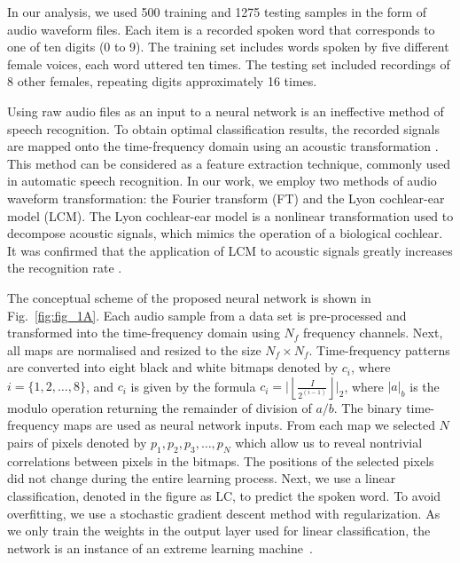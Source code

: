 \documentclass[
 print,
 amsmath,amssymb,
 aps,
]{revtex4-2}
\begin{document}
    In our analysis, we used 500 training and 1275 testing samples in the form of audio waveform files. Each item is a recorded spoken word that corresponds to one of ten digits (0 to 9). The training set includes words spoken by five different female voices,  each word uttered ten times. The testing set included recordings of 8 other females, repeating digits approximately 16 times.
    
    Using  raw audio files as an input to a neural network is an ineffective method of speech recognition. To obtain optimal classification results, the recorded signals are mapped onto the time-frequency domain using an acoustic transformation \citep{AbreuAraujo2020}. This method can be considered as a feature extraction technique, commonly used in automatic speech recognition. In our work, we employ two methods of audio waveform transformation: the Fourier transform (FT) and the Lyon cochlear-ear model (LCM). The Lyon cochlear-ear model is a nonlinear transformation used to decompose acoustic signals, which mimics the operation of a biological cochlear. It was confirmed that the application of LCM to acoustic signals greatly increases the recognition rate \citep{AbreuAraujo2020}. 
    
    The conceptual scheme of the proposed neural network is shown in Fig.~\ref{fig:fig_1A}. Each audio sample from a data set is pre-processed and transformed into the time-frequency domain using $ N_f $ frequency channels. Next, all maps are normalised and resized to the size $N_f \times N_f$. Time-frequency patterns are converted into eight black and white bitmaps denoted by $ c_i $, where $i= \{1,2, \dots, 8 \}$, and $c_i$ is given by the formula $c_i=\Big| \left \lfloor{\frac{I}{2^{(i-1)}}}\right \rfloor\Big|_2$, where $|a|_b$ is the modulo operation returning the remainder of division of $a/b$. The binary time-frequency maps are used as neural network inputs. From each map we selected $N$ pairs of pixels denoted by $p_1,p_2,p_3,\dots,p_N$ which allow us to reveal nontrivial correlations between pixels in the bitmaps. The positions of the selected pixels did not change during the entire learning process. Next, we use a linear classification, denoted in the figure as LC, to predict the spoken word. To avoid overfitting, we use a stochastic gradient descent method with regularization. As we only train the weights in the output layer used for linear classification, the network is an instance of an extreme learning machine~\cite{Huang_ExtremeLearningMachines}.
    
\end{document}

